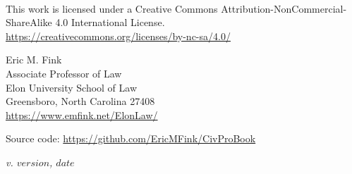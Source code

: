 \begin{fullwidth}
    ~\vfill
    \thispagestyle{empty}
    \setlength{\parindent}{0pt}
    \setlength{\parskip}{\baselineskip}

	\href{https://creativecommons.org/licenses/by-nc-sa/4.0/}{\ccbyncsa} 

	\begin{small}
	\raggedright{This work is licensed under a Creative Commons Attribution-NonCommercial-ShareAlike 4.0 International License.} \\
	\url{https://creativecommons.org/licenses/by-nc-sa/4.0/}
	\end{small}

	\vspace{1em}

	\begin{small}
	\par{}

	Eric M. Fink\\
	Associate Professor of Law \\
	Elon University School of Law \\
	Greensboro, North Carolina 27408 \\
	\url{https://www.emfink.net/ElonLaw/}
    
	\vspace{1em}

	Source code: \url{https://github.com/EricMFink/CivProBook}

	\itshape{v. $version$, $date$}

	\end{small}

    \end{fullwidth}